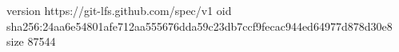 version https://git-lfs.github.com/spec/v1
oid sha256:24aa6e54801afe712aa555676dda59c23db7ccf9fecac944ed64977d878d30e8
size 87544
